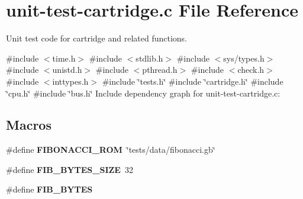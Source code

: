 \hypertarget{unit-test-cartridge_8c}{}\section{unit-\/test-\/cartridge.c File Reference}
\label{unit-test-cartridge_8c}


Unit test code for cartridge and related functions.  


{\ttfamily \#include $<$time.\+h$>$}\newline
{\ttfamily \#include $<$stdlib.\+h$>$}\newline
{\ttfamily \#include $<$sys/types.\+h$>$}\newline
{\ttfamily \#include $<$unistd.\+h$>$}\newline
{\ttfamily \#include $<$pthread.\+h$>$}\newline
{\ttfamily \#include $<$check.\+h$>$}\newline
{\ttfamily \#include $<$inttypes.\+h$>$}\newline
{\ttfamily \#include \char`\"{}tests.\+h\char`\"{}}\newline
{\ttfamily \#include \char`\"{}cartridge.\+h\char`\"{}}\newline
{\ttfamily \#include \char`\"{}cpu.\+h\char`\"{}}\newline
{\ttfamily \#include \char`\"{}bus.\+h\char`\"{}}\newline
Include dependency graph for unit-\/test-\/cartridge.c\+:
\subsection*{Macros}
\begin{DoxyCompactItemize}
\item 
\mbox{\label{unit-test-cartridge_8c_aa4552b8131d97267d57e0e0d97dc4a9f}} 
\#define {\bfseries F\+I\+B\+O\+N\+A\+C\+C\+I\+\_\+\+R\+OM}~\char`\"{}tests/data/fibonacci.\+gb\char`\"{}
\item 
\mbox{\label{unit-test-cartridge_8c_a6eb5ec4a679dbf4c759862654581fd7a}} 
\#define {\bfseries F\+I\+B\+\_\+\+B\+Y\+T\+E\+S\+\_\+\+S\+I\+ZE}~32
\item 
\#define {\bfseries F\+I\+B\+\_\+\+B\+Y\+T\+ES}
\end{DoxyCompactItemize}
